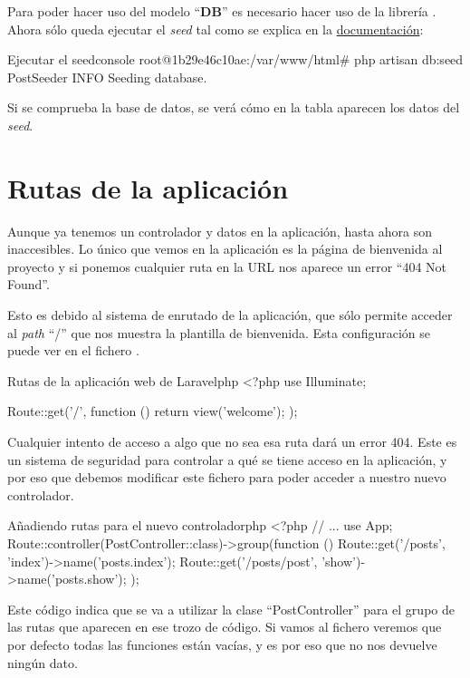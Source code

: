 Para poder hacer uso del modelo “\textbf{DB}” es necesario hacer uso de la librería . Ahora sólo queda ejecutar el \textit{seed} tal como se explica en la \href{https://laravel.com/docs/10.x/seeding}{documentación}:

\begin{mycode}{Ejecutar el seed}{console}{}
root@1b29e46c10ae:/var/www/html# php artisan db:seed PostSeeder
INFO  Seeding database.
\end{mycode}

Si se comprueba la base de datos, se verá cómo en la tabla aparecen los datos del \textit{seed}.


\chapter{Rutas de la aplicación}

Aunque ya tenemos un controlador y datos en la aplicación, hasta ahora son inaccesibles. Lo único que vemos en la aplicación es la página de bienvenida al proyecto y si ponemos cualquier ruta en la URL nos aparece un error “404 Not Found”.

Esto es debido al sistema de enrutado de la aplicación, que sólo permite acceder al \textit{path} “/” que nos muestra la plantilla de bienvenida. Esta configuración se puede ver en el fichero .

\begin{mycode}{Rutas de la aplicación web de Laravel}{php}{}
<?php
use Illuminate\Support\Facades\Route;

Route::get('/', function () {
    return view('welcome');
});
\end{mycode}

Cualquier intento de acceso a algo que no sea esa ruta dará un error 404. Este es un sistema de seguridad para controlar a qué se tiene acceso en la aplicación, y por eso que debemos modificar este fichero para poder acceder a nuestro nuevo controlador.

\begin{mycode}{Añadiendo rutas para el nuevo controlador}{php}{}
<?php
// ...
use App\Http\Controllers\PostController;
Route::controller(PostController::class)->group(function () {
    Route::get('/posts', 'index')->name('posts.index');
    Route::get('/posts/{post}', 'show')->name('posts.show');
});
\end{mycode}

Este código indica que se va a utilizar la clase “PostController” para el grupo de las rutas que aparecen en ese trozo de código. Si vamos al fichero  veremos que por defecto todas las funciones están vacías, y es por eso que no nos devuelve ningún dato.

